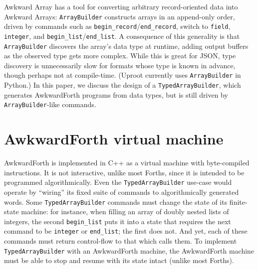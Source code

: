 \documentclass{webofc}
\begin{document}
Awkward Array has a tool for converting arbitrary record-oriented data into Awkward Arrays: \texttt{ArrayBuilder} constructs arrays in an append-only order, driven by commands such as \texttt{begin_record}/\texttt{end_record}, switch to \texttt{field}, \texttt{integer}, and \texttt{begin_list}/\texttt{end_list}. A consequence of this generality is that \texttt{ArrayBuilder} discovers the array's data type at runtime, adding output buffers as the observed type gets more complex. While this is great for JSON, type discovery is unnecessarily slow for formats whose type is known in advance, though perhaps not at compile-time. (Uproot currently uses \texttt{ArrayBuilder} in Python.) In this paper, we discuss the design of a \texttt{TypedArrayBuilder}, which generates AwkwardForth programs from data types, but is still driven by \texttt{ArrayBuilder}-like commands.

\section{AwkwardForth virtual machine}

AwkwardForth is implemented in C++ as a virtual machine with byte-compiled instructions. It is not interactive, unlike most Forths, since it is intended to be programmed algorithmically. Even the \texttt{TypedArrayBuilder} use-case would operate by ``wiring'' its fixed suite of commands to algorithmically generated words. Some \texttt{TypedArrayBuilder} commands must change the state of its finite-state machine: for instance, when filling an array of doubly nested lists of integers, the second \texttt{begin_list} puts it into a state that requires the next command to be \texttt{integer} or \texttt{end_list}; the first does not. And yet, each of these commands must return control-flow to that which calls them. To implement \texttt{TypedArrayBuilder} with an AwkwardForth machine, the AwkwardForth machine must be able to stop and resume with its state intact (unlike most Forths).
\end{document}
